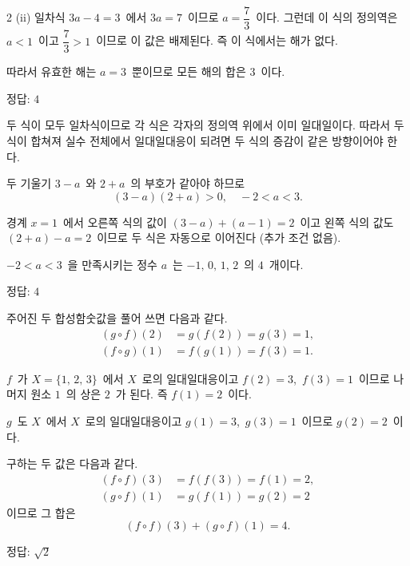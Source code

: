\documentclass[10pt,fleqn]{article}
\begin{document}
\begin{multicols*}{2}
\vspace{3mm}
(ii) 일차식 $3a - 4 = 3$\ 에서 $3a = 7$\ 이므로 $a = \dfrac{7}{3}$\ 이다. 그런데 이 식의 정의역은 $a < 1$\ 이고 $\dfrac{7}{3} > 1$\ 이므로 이 값은 배제된다. 즉 이 식에서는 해가 없다.

\vspace{3mm}
따라서 유효한 해는 $a = 3$\ 뿐이므로 모든 해의 합은 $3$\ 이다.
\begin{dmanswerbox}
정답: $4$
\end{dmanswerbox}

두 식이 모두 일차식이므로 각 식은 각자의 정의역 위에서 이미 일대일이다. 따라서 두 식이 합쳐져 실수 전체에서 일대일대응이 되려면 두 식의 증감이 같은 방향이어야 한다.

두 기울기 $3 - a$\ 와 $2 + a$\ 의 부호가 같아야 하므로
\[ (3 - a)(2 + a) > 0,\quad -2 < a < 3. \]

경계 $x = 1$\ 에서 오른쪽 식의 값이 $(3 - a) + (a - 1) = 2$\ 이고 왼쪽 식의 값도 $(2 + a) - a = 2$\ 이므로 두 식은 자동으로 이어진다 (추가 조건 없음).

$-2 < a < 3$\ 을 만족시키는 정수 $a$\ 는 $-1,\, 0,\, 1,\, 2$\ 의 $4$\ 개이다.
\begin{dmanswerbox}
정답: $4$
\end{dmanswerbox}

주어진 두 합성함숫값을 풀어 쓰면 다음과 같다.
\begin{align*}
  (g \circ f)(2) &= g(f(2)) = g(3) = 1,\\
  (f \circ g)(1) &= f(g(1)) = f(3) = 1.
\end{align*}

$f$\ 가 $X = \{1,\, 2,\, 3\}$\ 에서 $X$\ 로의 일대일대응이고 $f(2) = 3$,\ $f(3) = 1$\ 이므로 나머지 원소 $1$\ 의 상은 $2$\ 가 된다. 즉 $f(1) = 2$\ 이다.

$g$\ 도 $X$\ 에서 $X$\ 로의 일대일대응이고 $g(1) = 3$,\ $g(3) = 1$\ 이므로 $g(2) = 2$\ 이다.

구하는 두 값은 다음과 같다.
\begin{align*}
  (f \circ f)(3) &= f(f(3)) = f(1) = 2,\\
  (g \circ f)(1) &= g(f(1)) = g(2) = 2
\end{align*}
이므로 그 합은
\[ (f \circ f)(3) + (g \circ f)(1) = 4. \]

\begin{dmanswerbox}
정답: $\sqrt{2}$
\end{dmanswerbox}


\end{multicols*}
\end{document}
